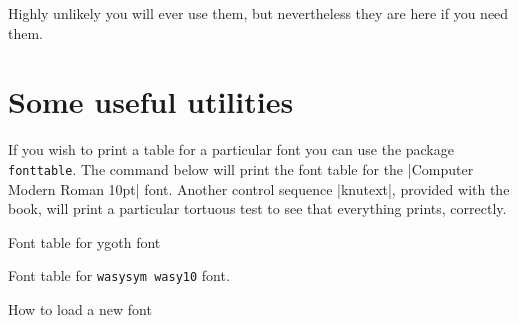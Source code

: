 Highly unlikely you will ever use them, but nevertheless they are here if you need them.

\section{Some useful utilities}

\begin{multicols}{2}
If you wish to print a table for a particular font you can use the package \texttt{fonttable}. The command
below will print the font table for the |Computer Modern Roman 10pt| font. Another control sequence |knutext|, provided with the book, will print a particular tortuous test to see that everything prints, correctly.


\begin{teX}
\end{teX}
\end{multicols}


\begin{multicols}{2}
{\footnotesize \knutext\par }
\end{multicols}


\begin{table}[htbp]
\caption{Font table for ygoth font}
\end{table}



\begin{table}[htbp]
\caption{Font table for \texttt{wasysym wasy10} font.}
\end{table}



\bigskip
\centerline{\Large How to load a new font}
\bigskip

